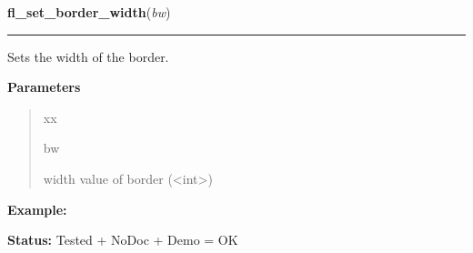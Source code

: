 \hspace{.8\funcindent}\begin{boxedminipage}{\funcwidth}

    \raggedright \textbf{fl\_set\_border\_width}(\textit{bw})

    \vspace{-1.5ex}

    \rule{\textwidth}{0.5\fboxrule}
\setlength{\parskip}{2ex}
    Sets the width of the border.

\setlength{\parskip}{1ex}
      \textbf{Parameters}
      \vspace{-1ex}

      \begin{quote}
        \begin{Ventry}{xx}

          \item[bw]

          width value of border ({\textless}int{\textgreater})

        \end{Ventry}

      \end{quote}

\textbf{Example:} 

\textbf{Status:} Tested + NoDoc + Demo = OK



    \end{boxedminipage}

    \label{xformslib:library:fl_set_scrollbar_type}

    \vspace{0.5ex}

